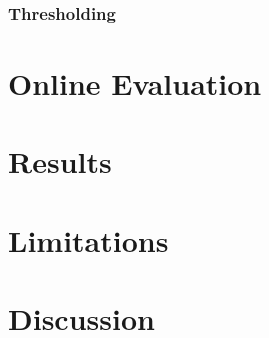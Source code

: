 \subsubsection{Thresholding}

\section{Online Evaluation}

\section{Results}

\section{Limitations}

\section{Discussion}



